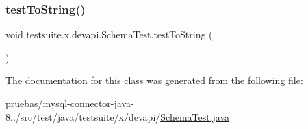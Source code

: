 \subsubsection{\texorpdfstring{test\+To\+String()}{testToString()}}
{\footnotesize\ttfamily void testsuite.\+x.\+devapi.\+Schema\+Test.\+test\+To\+String (\begin{DoxyParamCaption}{ }\end{DoxyParamCaption})}



The documentation for this class was generated from the following file\+:\begin{DoxyCompactItemize}
\item 
pruebas/mysql-\/connector-\/java-\/8../src/test/java/testsuite/x/devapi/\mbox{\hyperlink{_schema_test_8java}{Schema\+Test.\+java}}\end{DoxyCompactItemize}

